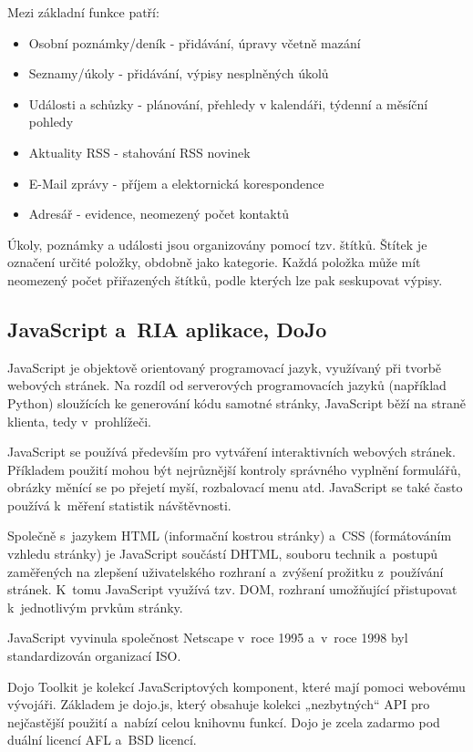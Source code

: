 \documentclass[bc,male,html,dept460]{diploma}				%
\begin{document}
Mezi základní funkce patří:
\begin{itemize}
 \item Osobní poznámky/deník - přidávání, úpravy včetně mazání
 \item Seznamy/úkoly - přidávání, výpisy nesplněných úkolů
 \item Události a schůzky - plánování, přehledy v kalendáři, týdenní a měsíční pohledy
 \item Aktuality RSS - stahování RSS novinek
 \item E-Mail zprávy - příjem a elektornická korespondence
 \item Adresář - evidence, neomezený počet kontaktů
\end{itemize}

Úkoly, poznámky a události jsou organizovány pomocí tzv. štítků. Štítek je označení určité položky, obdobně jako kategorie.
Každá položka může mít neomezený počet přiřazených štítků, podle kterých lze pak seskupovat výpisy.



\subsection{JavaScript a~RIA aplikace, DoJo}
JavaScript je objektově orientovaný programovací jazyk, využívaný při tvorbě webových stránek. Na rozdíl od serverových programovacích jazyků (například Python) sloužících ke generování kódu samotné stránky, JavaScript běží na straně klienta, tedy v~prohlížeči.

JavaScript se používá především pro vytváření interaktivních webových stránek. Příkladem použití mohou být nejrůznější kontroly správného vyplnění formulářů, obrázky měnící se po přejetí myší, rozbalovací menu atd. JavaScript se také často používá k~měření statistik návštěvnosti.

Společně s~jazykem HTML (informační kostrou stránky) a~CSS (formátováním vzhledu stránky) je JavaScript součástí DHTML, souboru technik a~postupů zaměřených na zlepšení uživatelského rozhraní a~zvýšení prožitku z~používání stránek. K~tomu JavaScript využívá tzv. DOM, rozhraní umožňující přistupovat k~jednotlivým prvkům stránky.

JavaScript vyvinula společnost Netscape v~roce 1995 a~v~roce 1998 byl standardizován organizací ISO.
\cite{javascript-definice}

Dojo Toolkit je kolekcí JavaScriptových komponent, které mají pomoci webovému vývojáři. Základem je dojo.js, který obsahuje kolekci „nezbytných“ API pro nejčastější použití a~nabízí celou knihovnu funkcí. Dojo je zcela zadarmo pod duální licencí AFL a~BSD licencí.
\end{document}
